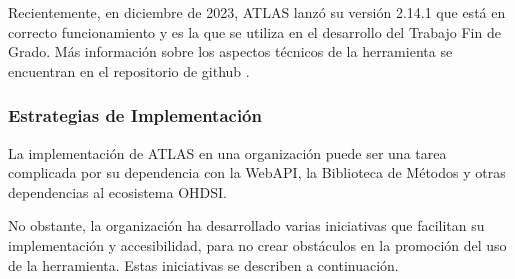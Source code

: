 Recientemente, en diciembre de 2023, ATLAS lanzó su versión 2.14.1 que está en correcto funcionamiento y es la que se utiliza en el desarrollo del Trabajo Fin de Grado. Más información sobre los aspectos técnicos de la herramienta se encuentran en el repositorio de github \parencite{githubATLAS}.

\subsubsection{Estrategias de Implementación}

La implementación de ATLAS en una organización puede ser una tarea complicada por su dependencia con la WebAPI, la Biblioteca de Métodos y otras dependencias al ecosistema OHDSI. 

No obstante, la organización ha desarrollado varias iniciativas que facilitan su implementación y accesibilidad, para no crear obstáculos en la promoción del uso de la herramienta. Estas iniciativas se describen a continuación.

